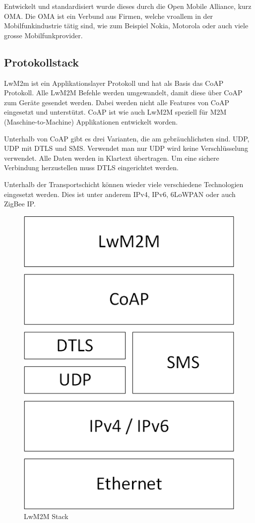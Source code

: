 Entwickelt und standardisiert wurde dieses durch die Open Mobile Alliance, kurz OMA. Die OMA ist ein Verbund aus Firmen, welche vroallem in der Mobilfunkindustrie tätig sind, wie zum Beispiel Nokia, Motorola oder auch viele grosse Mobilfunkprovider. 

\subsection{Protokollstack}

LwM2m ist ein Applikationslayer Protokoll und hat als Basis das CoAP Protokoll. Alle LwM2M Befehle werden umgewandelt, damit diese über CoAP zum Geräte gesendet werden. Dabei werden nicht alle Features von CoAP eingesetzt und unterstützt. CoAP ist wie auch LwM2M speziell für M2M (Maschine-to-Machine) Applikationen entwickelt worden.

Unterhalb von CoAP gibt es drei Varianten, die am gebräuchlichsten sind. UDP, UDP mit DTLS und SMS. Verwendet man nur UDP wird keine Verschlüsselung verwendet. Alle Daten werden in Klartext übertragen. Um eine sichere Verbindung herzustellen muss DTLS eingerichtet werden.

Unterhalb der Transportschicht können wieder viele verschiedene Technologien eingesetzt werden. Dies ist unter anderem IPv4, IPv6, 6LoWPAN oder auch ZigBee IP. 
\begin{figure}[H]
\includegraphics[scale=0.3]{../02_Analyse/images/lwm2m/stack.png}
\caption{LwM2M Stack}
\end{figure}


